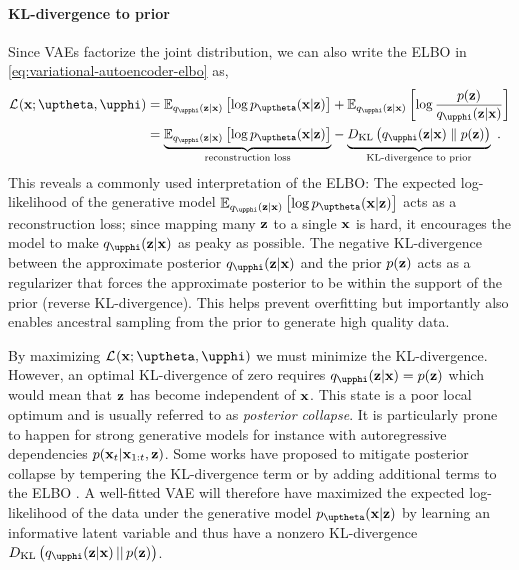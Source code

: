\paragraph{KL-divergence to prior}
Since VAEs factorize the joint distribution, we can also write the ELBO in \cref{eq:variational-autoencoder-elbo} as,
%
\begin{align} \label{eq:variational-autoencoder-elbo-factorized}
    \mathcal{L}_{}(\xb;\thetab,\phib)
    &= \mathbb{E}_{q_\phib(\zb|\xb)}\left[\log p_\thetab(\xb|\zb)\right] + \mathbb{E}_{q_\phib(\zb|\xb)} \left[ \log \frac{p(\zb)}{q_\phib(\zb|\xb)}\right] \nonumber \\
    &= 
    \underset{\text{reconstruction loss}}{\underbrace{
        \mathbb{E}_{q_\phib(\zb|\xb)}\left[\log p_\thetab(\xb|\zb)\right]
    }}
     - 
    \underset{\text{KL-divergence to prior}}{
        \underbrace{\vphantom{\mathbb{E}_{q_\phib(\zb|\xb)}\left[\log p_\thetab(\xb|\zb)\right]}{D_\text{KL}\left( q_\phib(\zb|\xb) \parallel p(\zb) \right)}
    }} \enspace .
\end{align}
%
This reveals a commonly used interpretation of the ELBO: 
The expected log-likelihood of the generative model $\mathbb{E}_{q_\phib(\zb|\xb)}\left[\log p_\thetab(\xb|\zb)\right]$ acts as a reconstruction loss; since mapping many ${\mathbf{z}}$ to a single ${\mathbf{x}}$ is hard, it encourages the model to make $q_\phib(\zb|\xb)$ as peaky as possible. 
The negative KL-divergence between the approximate posterior $q_\phib(\zb|\xb)$ and the prior $p({\mathbf{z}})$ acts as a regularizer that forces the approximate posterior to be within the support of the prior (reverse KL-divergence). This helps prevent overfitting but importantly also enables ancestral sampling from the prior to generate high quality data. 

By maximizing $\mathcal{L}_{}(\xb;\thetab,\phib)$ we must minimize the KL-divergence. However, an optimal KL-divergence of zero requires $q_\phib(\zb|\xb) = p(\zb)$ which would mean that ${\mathbf{z}}$ has become independent of ${\mathbf{x}}$. 
This state is a poor local optimum and is usually referred to as \emph{posterior collapse}. It is particularly prone to happen for strong generative models for instance with autoregressive dependencies $p({\mathbf{x}}_{t}|{\mathbf{x}}_{1:t},{\mathbf{z}})$. Some works have proposed to mitigate posterior collapse by tempering the KL-divergence term \parencite{alemi_fixing_2018,higgins_vvae_2017} or by adding additional terms to the ELBO \parencite{zhao_infovae_2018}. 
A well-fitted VAE will therefore have maximized the expected log-likelihood of the data under the generative model $p_\thetab(\xb|\zb)$ by learning an informative latent variable and thus have a nonzero KL-divergence $D_\text{KL}\left( q_\phib(\zb|\xb) \,||\, p(\zb) \right)$. 



